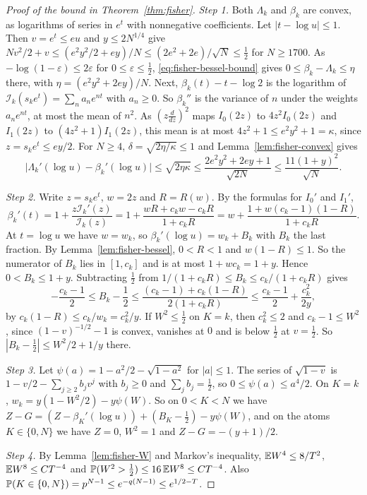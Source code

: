 \begin{proof}[Proof of the bound in Theorem~\ref{thm:fisher}]
\emph{Step 1.} Both $\Lambda_k$ and $\beta_k$ are convex, as logarithms of
series in $e^t$ with nonnegative coefficients. Let $|t-\log
u|\le1$. Then $v=e^t\le eu$ and $y\le2N^{1/4}$ give
$Nv^2/2+v\le(e^2y^2/2+ey)/N\le(2e^2+2e)/\sqrt N\le\frac12$ for $N\ge1700$. As
$-\log(1-\varepsilon)\le2\varepsilon$ for $0\le\varepsilon\le\frac12$,
\eqref{eq:fisher-bessel-bound} gives $0\le\beta_k-\Lambda_k\le\eta$ there,
with $\eta=(e^2y^2+2ey)/N$. Next, $\beta_k(t)-t-\log2$ is the logarithm of
$\mathcal I_k(s_ke^t)=\sum_na_ne^{nt}$ with $a_n\ge0$. So $\beta_k''$ is the
variance of $n$ under the weights $a_ne^{nt}$, at most the mean of $n^2$. As
$(z\frac d{dz})^2$ maps $I_0(2z)$ to $4z^2I_0(2z)$ and $I_1(2z)$ to
$(4z^2+1)I_1(2z)$, this mean is at most $4z^2+1\le e^2y^2+1=\kappa$, since
$z=s_ke^t\le ey/2$. For $N\ge4$,
$\delta=\sqrt{2\eta/\kappa}\le1$ and Lemma~\ref{lem:fisher-convex} gives
\begin{equation}\label{eq:fisher-step1}
 \bigl|\Lambda_k'(\log u)-\beta_k'(\log u)\bigr|
 \le\sqrt{2\eta\kappa}
 \le\frac{2e^2y^2+2ey+1}{\sqrt{2N}}\le\frac{11(1+y)^2}{\sqrt N}.
\end{equation}

\emph{Step 2.} Write $z=s_ke^t$, $w=2z$ and $R=R(w)$. By the formulas for
$I_0'$ and $I_1'$,
\[
 \beta_k'(t)=1+\frac{z\mathcal I_k'(z)}{\mathcal I_k(z)}
 =1+\frac{wR+c_kw-c_kR}{1+c_kR}=w+\frac{1+w(c_k-1)(1-R)}{1+c_kR}.
\]
At $t=\log u$ we have $w=w_k$, so $\beta_k'(\log u)=w_k+B_k$ with $B_k$ the
last fraction. By Lemma~\ref{lem:fisher-bessel}, $0<R<1$ and $w(1-R)\le1$.
So the numerator of $B_k$ lies in $[1,c_k]$ and is at most
$1+wc_k=1+y$. Hence $0<B_k\le1+y$. Subtracting $\frac12$ from
$1/(1+c_kR)\le B_k\le c_k/(1+c_kR)$ gives
\[
 -\frac{c_k-1}2\le B_k-\frac12\le\frac{(c_k-1)+c_k(1-R)}{2(1+c_kR)}
 \le\frac{c_k-1}2+\frac{c_k^2}{2y},
\]
by $c_k(1-R)\le c_k/w_k=c_k^2/y$. If $W^2\le\frac12$ on $K=k$, then
$c_k^2\le2$ and $c_k-1\le W^2$, since $(1-v)^{-1/2}-1$ is convex, vanishes
at $0$ and is below $\frac12$ at $v=\frac12$. So
$|B_k-\frac12|\le W^2/2+1/y$ there.

\emph{Step 3.} Let $\psi(a)=1-a^2/2-\sqrt{1-a^2}$ for $|a|\le1$.
The series of $\sqrt{1-v}$ is $1-v/2-\sum_{j\ge2}b_jv^j$ with $b_j\ge0$ and
$\sum_jb_j=\frac12$, so $0\le\psi(a)\le a^4/2$. On $K=k$,
$w_k=y(1-W^2/2)-y\psi(W)$. So on $0<K<N$ we have
$Z-G=(Z-\beta_K'(\log u))+(B_K-\frac12)-y\psi(W)$, and on the atoms
$K\in\{0,N\}$ we have $Z=0$, $W^2=1$ and $Z-G=-(y+1)/2$.

\emph{Step 4.} By Lemma~\ref{lem:fisher-W} and Markov's inequality,
$\mathbb E W^4\le8/T^2$, $\mathbb E W^8\le CT^{-4}$ and
$\mathbb P(W^2>\frac12)\le16\,\mathbb E W^8\le CT^{-4}$. Also
$\mathbb P(K\in\{0,N\})=p^{N-1}\le e^{-q(N-1)}\le e^{1/2-T}$.


\end{proof}
